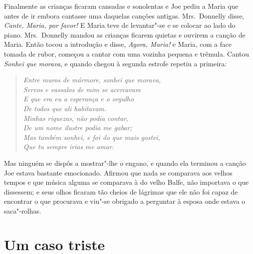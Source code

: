 Finalmente as crianças ficaram cansadas e sonolentas e Joe pediu a Maria que
antes de ir embora cantasse uma daquelas canções antigas.  Mrs.~Donnelly
disse, \textit{Cante, Maria, por favor!}  E Maria teve de levantar"-se e se
colocar ao lado do piano.  Mrs.~Donnelly mandou as crianças ficarem quietas e
ouvirem a canção de Maria.  Então tocou a introdução e disse, \textit{Agora,
Maria!} e Maria, com a face tomada de rubor, começou a cantar com uma vozinha
pequena e trêmula.  Cantou \textit{Sonhei que morava}, e quando chegou à
segunda estrofe repetiu a primeira:

\begin{verse}\itshape
Entre muros de mármore, sonhei que morava,\\
Servos e vassalos de mim se acercavam\\
E que era eu a esperança e o orgulho\\
De todos que ali habitavam.\\
Minhas riquezas, não podia contar,\\
De um nome ilustre podia me gabar;\\
Mas também sonhei, e foi do que mais gostei,\\
Que tu sempre irias me amar.
\end{verse}

Mas ninguém se dispôs a mostrar"-lhe o engano, e quando ela terminou a canção
Joe estava bastante emocionado.  Afirmou que nada se comparava aos velhos
tempos e que música alguma se comparava à do velho Balfe, não importava o que
dissessem; e seus olhos ficaram tão cheios de lágrimas que ele não foi capaz de
encontrar o que procurava e viu"-se obrigado a perguntar à esposa onde estava o
saca"-rolhas.


\chapter{Um caso triste}

